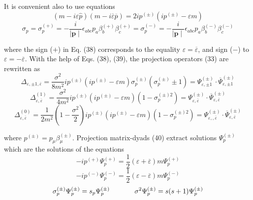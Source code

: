 \documentclass[a4paper,12pt]{article}
\begin{document}
It is convenient also to use equations
\begin{equation}
\left( m-i\varepsilon \widehat{p}\right) \left(
m-i\overline{\varepsilon } \overline{p}\right) =2ip^{(\pm )}\left(
ip^{(\pm )}-\varepsilon m\right) \label{38}
\end{equation}
\begin{equation}
\sigma _p=\sigma _p^{(+)}=-\frac i{\mid \mathbf{p}\mid }\epsilon
_{abc}p_a\beta _b^{(+)}\beta _c^{(+)}=\sigma _p^{(-)}=-\frac
i{\mid \mathbf{p }\mid }\epsilon _{abc}p_a\beta _b^{(-)}\beta
_c^{(-)}  \label{39}
\end{equation}

where the sign ($+$) in Eq. (38) corresponds to the equality
$\varepsilon = \overline{\varepsilon }$, and sign ($-$) to
$\varepsilon =-\overline{ \varepsilon }$. With the help of Eqs.
(38), (39), the projection operators (33) are rewritten as
\[
\Delta _{\varepsilon ,\pm 1,\overline{\varepsilon }}=\frac{\sigma
^2}{8m^2} ip^{(\pm )}\left( ip^{(\pm )}-\varepsilon m\right)
\sigma _p^{(\pm )}\left( \sigma _p^{(\pm )}\pm 1\right) =\Psi
_{\varepsilon ,\pm 1}^{(\pm )}\cdot \overline{\Psi }_{\varepsilon
,\pm 1}^{(\pm )}
\]
\[
\Delta _{\varepsilon ,\overline{\varepsilon }}^{(1)}=\frac{\sigma
^2}{4m^2} ip^{(\pm )}\left( ip^{(\pm )}-\varepsilon m\right)
\left( 1-\sigma _p^{(\pm )2}\right) =\Psi _{\varepsilon
,\overline{\varepsilon }}^{(\pm )}\cdot \overline{\Psi
}_{\varepsilon ,\overline{\varepsilon }}^{(\pm )}
\]
\begin{equation}
\Delta _{\varepsilon ,\overline{\varepsilon }}^{(0)}=\frac
1{2m^2}\left( 1- \frac{\sigma ^2}2\right) ip^{(\pm )}\left(
ip^{(\pm )}-\varepsilon m\right) \left( 1-\sigma _p^{(\pm
)2}\right) =\Psi _{\varepsilon ,,\overline{ \varepsilon }}^{(\pm
)}\cdot \overline{\Psi }_{\varepsilon ,\overline{ \varepsilon
}}^{(\pm )}  \label{40}
\end{equation}

where $p^{(\pm )}=p_\mu \beta _\mu ^{(\pm )}.$ Projection matrix-dyads (40)
extract solutions $\Psi _p^{(\pm )}$ which are the solutions of the
equations
\begin{equation}
-ip^{(+)}\Psi _p^{(+)}=\frac 12\left( \varepsilon
+\overline{\varepsilon } \right) m\Psi _p^{(+)}  \label{41}
\end{equation}
\begin{equation}
-ip^{(-)}\Psi _p^{(-)}=\frac 12\left( \varepsilon
-\overline{\varepsilon } \right) m\Psi _p^{(-)}  \label{42}
\end{equation}
\begin{equation}
\sigma _p^{(\pm )}\Psi _p^{(\pm )}=s_p\Psi _p^{(\pm )}\hspace{0.5in}\sigma
^2\Psi _p^{(\pm )}=s(s+1)\Psi _p^{(\pm )}  \label{43}
\end{equation}
\end{document}
